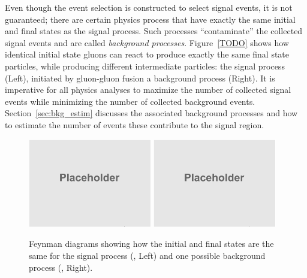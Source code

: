 Even though the event selection is constructed to select signal events, it is not guaranteed;
there are certain physics process that have exactly the same initial and final states as the signal process.
Such processes ``contaminate'' the collected signal events and are called \emph{background processes}.
Figure~\ref{TODO} shows how identical initial state gluons can react to produce exactly the same final state particles, while producing different intermediate particles:
the signal process (Left), initiated by gluon-gluon fusion \vs a background process (Right).
It is imperative for all physics analyses to maximize the number of collected signal events while minimizing the number of collected background events.
Section~\ref{sec:bkg_estim} discusses the associated background processes and how to estimate the number of events these contribute to the signal region.
\begin{figure}[!htbp]
	\begin{center}
		\includegraphics[width=0.48\textwidth]{figures/placeholder.png}  %
		\includegraphics[width=0.48\textwidth]{figures/placeholder.png}  %
		\caption{
            Feynman diagrams showing how the initial and final states are the same
            for the signal process (\gghzzfourl, Left) and one possible background process (\ggzzfourl, Right).
        }
		\label{fig:feyndiag_sig_vs_bkg}
	\end{center}
\end{figure}

